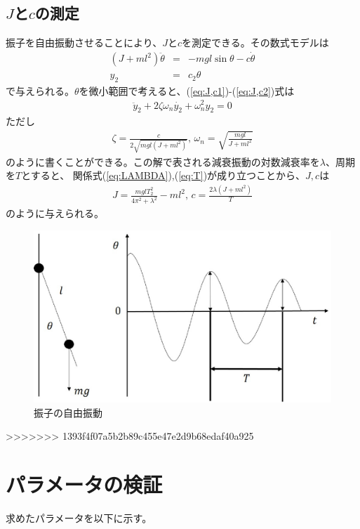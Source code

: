 \documentclass[a4j,11pt,twoside]{ujbook}
\begin{document}
	\subsection{$J$と$c$の測定}
	振子を自由振動させることにより、$J$と$c$を測定できる。その数式モデルは
	\begin{eqnarray}
		(J+ml^2)\ddot{\theta} & = & -mgl\sin{\theta} - c\dot{\theta}
		\label{eq:J,c1}\\
		y_2 & = & c_2\theta
		\label{eq:J,c2}
	\end{eqnarray}
	で与えられる。$\theta$を微小範囲で考えると、(\ref{eq:J,c1})-(\ref{eq:J,c2})式は
	\begin{eqnarray*}
		\ddot{y}_2 + 2\zeta\omega_n\dot{y_2} + \omega_n^2y_2 = 0
	\end{eqnarray*}
	ただし
	\begin{eqnarray*}
		\zeta = \frac{c}{2\sqrt{mgl(J + ml^2)}},\,
		\omega_n = \sqrt{\frac{mgl}{J + ml^2}}
	\end{eqnarray*}
	のように書くことができる。この解で表される減衰振動の対数減衰率を$\lambda$、周期を$T$とすると、
	関係式(\ref{eq:LAMBDA}),(\ref{eq:T})が成り立つことから、$J,c$は
	\begin{eqnarray}
		J = \frac{mglT_2^2}{4\pi^2 + \lambda^2} - ml^2 ,\, c = \frac{2\lambda(J +
		ml^2)}{T}
	\end{eqnarray}
	のように与えられる。

	\begin{figure}[htbp]
		\begin{center}
			\includegraphics[width = 0.7 \linewidth]{freePend.eps}
			\caption{振子の自由振動}
			\label{fig:振子の自由振動}
		\end{center}
	\end{figure}

>>>>>>> 1393f4f07a5b2b89c455e47e2d9b68edaf40a925

\section{パラメータの検証}
求めたパラメータを以下に示す。
\end{document}
